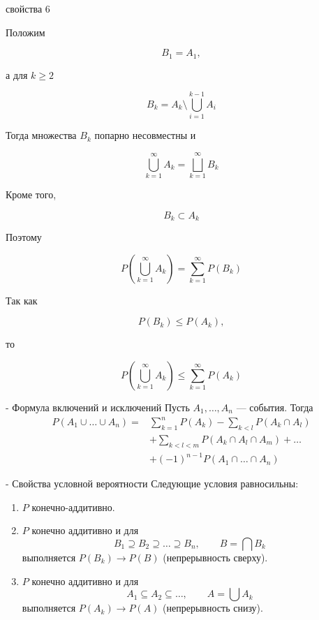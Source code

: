 \documentclass[12pt,a4paper]{article}
\begin{document}
\begin{proofbox}{свойства 6}

Положим

\[
B_1=A_1,
\]

а для $k\geq2$

\[
B_k
=
A_k\setminus
\bigcup_{i=1}^{k-1}A_i
\]

Тогда множества $B_k$ попарно несовместны и

\[
\bigcup_{k=1}^{\infty}A_k
=
\bigsqcup_{k=1}^{\infty}B_k
\]

Кроме того,

\[
B_k\subset A_k
\]

Поэтому

\[
P\left(
\bigcup_{k=1}^{\infty}A_k
\right)
=
\sum_{k=1}^{\infty}P(B_k)
\]

Так как

\[
P(B_k)\leq P(A_k),
\]

то

\[
P\left(
\bigcup_{k=1}^{\infty}A_k
\right)
\leq
\sum_{k=1}^{\infty}P(A_k)
\]

\end{proofbox}

\begin{theorem}{- Формула включений и исключений}
Пусть $A_1,\dots,A_n$ --- события. Тогда
\[
\begin{aligned}
P(A_1\cup\dots\cup A_n)
={}&\sum_{k=1}^{n}P(A_k)
-\sum_{k<l}P(A_k\cap A_l)\\
&+\sum_{k<l<m}P(A_k\cap A_l\cap A_m)
+\dots\\
&+(-1)^{n-1}P(A_1\cap\dots\cap A_n)
\end{aligned}
\]
\end{theorem}

\begin{theorem}{- Свойства условной вероятности}
Следующие условия равносильны:

\begin{enumerate}
    \item $P$ конечно-аддитивно.
    \item $P$ конечно аддитивно и для
    \[
    B_1\supseteq B_2\supseteq\dots\supseteq B_n,\qquad
    B=\bigcap B_k
    \]
    выполняется $P(B_k)\to P(B)$
    (непрерывность сверху).

    \item $P$ конечно аддитивно и для
    \[
    A_1\subseteq A_2\subseteq\dots,\qquad
    A=\bigcup A_k
    \]
    выполняется $P(A_k)\to P(A)$ (непрерывность снизу).
\end{enumerate}
\end{theorem}
\end{document}
